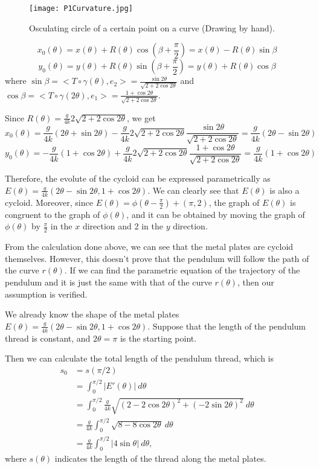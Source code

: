 \documentclass{article}
\begin{document}
\begin{figure}[H]
\centering
\texttt{[image: P1Curvature.jpg]}
\caption{Osculating circle of a certain point on a curve (Drawing by hand).}
\label{g2}
\end{figure}
	$$x_0(\theta)=x(\theta)+R(\theta)\cos(\beta+\frac{\pi}{2})=x(\theta)-R(\theta)\sin\beta$$
	$$y_0(\theta)=y(\theta)+R(\theta)\sin(\beta+\frac{\pi}{2})=y(\theta)+R(\theta)\cos\beta$$
	where $\sin\beta=<T\circ\gamma(\theta),e_2>=\frac{\sin2\theta}{\sqrt{2+2\cos2\theta}}$ and $\cos\beta=<T\circ\gamma(2\theta),e_1>=\frac{1+\cos2\theta}{\sqrt{2+2\cos2\theta}}$.
	\par Since $R(\theta)=\frac{g}{4k}2\sqrt{2+2\cos2\theta}$, we get
	$$x_0(\theta)=\frac{g}{4k}(2\theta+\sin2\theta)-\frac{g}{4k}2\sqrt{2+2\cos2\theta}\frac{\sin2\theta}{\sqrt{2+2\cos2\theta}}=\frac{g}{4k}(2\theta-\sin2\theta)$$
	$$y_0(\theta)=-\frac{g}{4k}(1+\cos2\theta)+\frac{g}{4k}2\sqrt{2+2\cos2\theta}\frac{1+\cos2\theta}{\sqrt{2+2\cos2\theta}}=\frac{g}{4k}(1+\cos2\theta)$$
	\par Therefore, the evolute of the cycloid can be expressed parametrically as $E(\theta)=\frac{g}{4k}(2\theta-\sin2\theta,1+\cos2\theta)$. We can clearly see that $E(\theta)$ is also a cycloid. Moreover, since $E(\theta)=\phi(\theta-\frac{\pi}{2})+(\pi,2)$, the graph of $E(\theta)$ is congruent to the graph of $\phi(\theta)$, and it can be obtained by moving the graph of $\phi(\theta)$ by $\frac{\pi}{2}$ in the $x$ direction and 2 in the $y$ direction.
	
		From the calculation done above, we can see that the metal plates are cycloid themselves. However, this doesn't prove that the pendulum will follow the path of the curve $r(\theta)$. If we can find the parametric equation of the trajectory of the pendulum and it is just the same with that of the curve $r(\theta)$, then our assumption is verified.

	We already know the shape of the metal plates $E(\theta)=\frac{g}{4k}(2\theta -\sin 2\theta ,1+\cos 2\theta )$. Suppose that the length of the pendulum thread is constant, and $2\theta = \pi$ is the starting point. 

	Then we can calculate the total length of the pendulum thread, which is
	\begin{equation*}
		\begin{aligned}
		s_0 &= s(\pi/2) \\
			&= \int_0^{\pi/2} |E'(\theta)| \ d\theta\\
			&= \int_0^{\pi/2} \frac{g}{4k}\sqrt{(2-2\cos 2\theta)^2+ (-2\sin 2\theta)^2} \ d\theta\\
			&= \frac{g}{4k} \int_0^{\pi/2} \sqrt{8-8\cos 2\theta}\ d\theta\\
			&= \frac{g}{4k} \int_0^{\pi/2} |4\sin\theta|\ d\theta,
		\end{aligned}
	\end{equation*}
	where $s(\theta)$ indicates the length of the thread along the metal plates.
\end{document}
